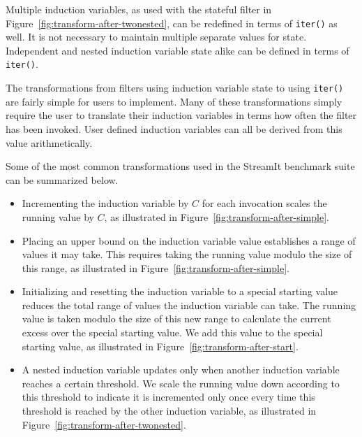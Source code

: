 Multiple induction variables, as used with the stateful filter in Figure~\ref{fig:transform-after-twonested}, can be redefined in terms of {\tt iter()} as well.  It is not necessary to maintain multiple separate values for state.  Independent and nested induction variable state alike can be defined in terms of {\tt iter()}.

The transformations from filters using induction variable state to using {\tt iter()} are fairly simple for users to implement.  Many of these transformations simply require the user to translate their induction variables in terms how often the filter has been invoked.  User defined induction variables can all be derived from this value arithmetically.  

Some of the most common transformations used in the StreamIt benchmark suite can be summarized below.  
\begin{itemize}
\item Incrementing the induction variable by $C$ for each invocation scales the running value by $C$, as illustrated in Figure~\ref{fig:transform-after-simple}.

\item Placing an upper bound on the induction variable value establishes a range of values it may take.  This requires taking the running value modulo the size of this range, as illustrated in Figure~\ref{fig:transform-after-simple}.

\item Initializing and resetting the induction variable to a special starting value reduces the total range of values the induction variable can take.  The running value is taken modulo the size of this new range to calculate the current excess over the special starting value.  We add this value to the special starting value, as illustrated in Figure~\ref{fig:transform-after-start}.

\item A nested induction variable updates only when another induction variable reaches a certain threshold.  We scale the running value down according to this threshold to indicate it is incremented only once every time this threshold is reached by the other induction variable, as illustrated in Figure~\ref{fig:transform-after-twonested}.
\end{itemize}

